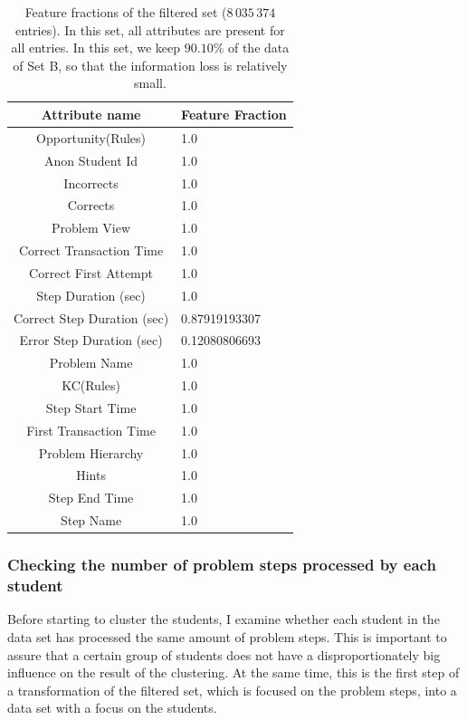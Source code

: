 \begin{table}[h]
	\centering
	\caption{Feature fractions of the filtered set ($8\,035\,374$ entries)\label{tab_ff_filtered_set}. In this set, all attributes are present for all entries. In this set, we keep $90.10\%$ of the data of Set B, so that the information loss is relatively small.}
	\begin{tabular}{cl}
		\toprule
		Attribute name & Feature Fraction \\		
		\midrule
		Opportunity(Rules) &1.0\\ 
		Anon Student Id & 1.0\\ 
		Incorrects & 1.0 \\
		Corrects & 1.0\\ 
		Problem View & 1.0\\ 
		Correct Transaction Time & 1.0\\ 
		Correct First Attempt & 1.0 \\
		Step Duration (sec) & 1.0\\ 
		Correct Step Duration (sec) & 0.87919193307\\ 
		Error Step Duration (sec) & 0.12080806693 \\
		Problem Name & 1.0\\ 
		KC(Rules) & 1.0 \\
		Step Start Time & 1.0\\  
		First Transaction Time & 1.0\\ 
		Problem Hierarchy & 1.0 \\
		Hints & 1.0\\ 
		Step End Time & 1.0\\ 
		Step Name & 1.0\\
		\bottomrule
	\end{tabular}
\end{table}

 \subsubsection{Checking the number of problem steps processed by each student}
 
 Before starting to cluster the students, I examine whether each student in the data set has processed the same amount of problem steps. This is important to assure that a certain group of students does not have a disproportionately big influence on the result of the clustering. At the same time, this is the first step of a transformation of the filtered set, which is focused on the problem steps, into a data set with a focus on the students.
 
